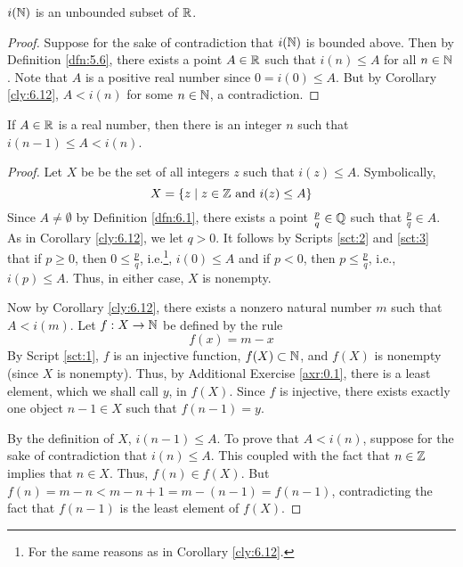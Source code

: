 \documentclass[../main.tex]{subfiles}
\begin{document}
\begin{corollary}\label{cly:6.13}
    $i(\mathbb{N})$ is an unbounded subset of $\mathbb{R}$.
    \begin{proof}
        Suppose for the sake of contradiction that $i(\mathbb{N})$ is bounded above. Then by Definition \ref{dfn:5.6}, there exists a point $A\in\mathbb{R}$ such that $i(n)\leq A$ for all $n\in\mathbb{N}$. Note that $A$ is a positive real number since $0=i(0)\leq A$. But by Corollary \ref{cly:6.12}, $A<i(n)$ for some $n\in\mathbb{N}$, a contradiction.
    \end{proof}
\end{corollary}

\begin{corollary}\label{cly:6.14}
    If $A\in\mathbb{R}$ is a real number, then there is an integer $n$ such that $i(n-1)\leq A<i(n)$.
    \begin{proof}
        Let $X$ be be the set of all integers $z$ such that $i(z)\leq A$. Symbolically,
        \begin{equation*}
            X = \{z\mid z\in\mathbb{Z}\text{ and }i(z)\leq A\}
        \end{equation*}
        Since $A\neq\emptyset$ by Definition \ref{dfn:6.1}, there exists a point $\frac{p}{q}\in\mathbb{Q}$ such that $\frac{p}{q}\in A$. As in Corollary \ref{cly:6.12}, we let $q>0$. It follows by Scripts \ref{sct:2} and \ref{sct:3} that if $p\geq 0$, then $0\leq\frac{p}{q}$, i.e.\footnote{For the same reasons as in Corollary \ref{cly:6.12}.}, $i(0)\leq A$ and if $p<0$, then $p\leq\frac{p}{q}$, i.e., $i(p)\leq A$. Thus, in either case, $X$ is nonempty.\par
        Now by Corollary \ref{cly:6.12}, there exists a nonzero natural number $m$ such that $A<i(m)$. Let $f:X\to\mathbb{N}$ be defined by the rule
        \begin{equation*}
            f(x) = m-x
        \end{equation*}
        By Script \ref{sct:1}, $f$ is an injective function, $f(X)\subset\mathbb{N}$, and $f(X)$ is nonempty (since $X$ is nonempty). Thus, by Additional Exercise \ref{axr:0.1}, there is a least element, which we shall call $y$, in $f(X)$. Since $f$ is injective, there exists exactly one object $n-1\in X$ such that $f(n-1)=y$.\par
        By the definition of $X$, $i(n-1)\leq A$. To prove that $A<i(n)$, suppose for the sake of contradiction that $i(n)\leq A$. This coupled with the fact that $n\in\mathbb{Z}$ implies that $n\in X$. Thus, $f(n)\in f(X)$. But $f(n)=m-n<m-n+1=m-(n-1)=f(n-1)$, contradicting the fact that $f(n-1)$ is the least element of $f(X)$.
    \end{proof}
\end{corollary}
\end{document}
